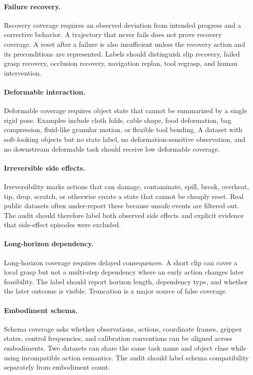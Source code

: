 \documentclass{article}
\begin{document}
\paragraph{Failure recovery.}
Recovery coverage requires an observed deviation from intended progress and a corrective behavior. A trajectory that never fails does not prove recovery coverage. A reset after a failure is also insufficient unless the recovery action and its preconditions are represented. Labels should distinguish slip recovery, failed grasp recovery, occlusion recovery, navigation replan, tool regrasp, and human intervention.

\paragraph{Deformable interaction.}
Deformable coverage requires object state that cannot be summarized by a single rigid pose. Examples include cloth folds, cable shape, food deformation, bag compression, fluid-like granular motion, or flexible tool bending. A dataset with soft-looking objects but no state label, no deformation-sensitive observation, and no downstream deformable task should receive low deformable coverage.

\paragraph{Irreversible side effects.}
Irreversibility marks actions that can damage, contaminate, spill, break, overheat, tip, drop, scratch, or otherwise create a state that cannot be cheaply reset. Real public datasets often under-report these because unsafe events are filtered out. The audit should therefore label both observed side effects and explicit evidence that side-effect episodes were excluded.

\paragraph{Long-horizon dependency.}
Long-horizon coverage requires delayed consequences. A short clip can cover a local grasp but not a multi-step dependency where an early action changes later feasibility. The label should report horizon length, dependency type, and whether the later outcome is visible. Truncation is a major source of false coverage.

\paragraph{Embodiment schema.}
Schema coverage asks whether observations, actions, coordinate frames, gripper states, control frequencies, and calibration conventions can be aligned across embodiments. Two datasets can share the same task name and object class while using incompatible action semantics. The audit should label schema compatibility separately from embodiment count.
\end{document}
